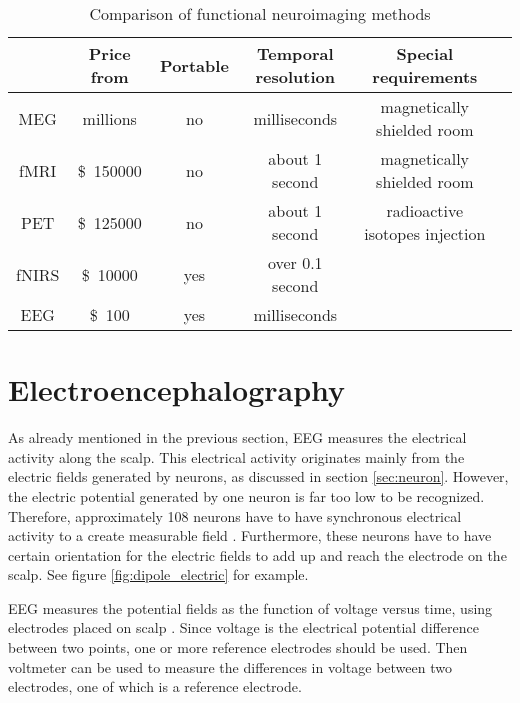 
\begin{table}[h]
	\centering
	\begin{tabular}{|c|c|c|c|c|c|}
	\hline
				& Price	from				& Portable	& Temporal resolution	& Special requirements		\\\hline
\acrshort{MEG}	& millions\pMEG				& no	& milliseconds \tresol		& magnetically shielded room\\\hline
\acrshort{fMRI}	& \SI{150000}[\$]\pfMRI		& no	& about 1 second \tresol	& magnetically shielded room\\\hline
\acrshort{PET}	& \SI{125000}[\$]\pPET		& no	& about 1 second \tresol	& radioactive isotopes injection\\\hline
\acrshort{fNIRS}& \SI{10000}[\$]{} \pNIRS	& yes	& over 0.1 second \pNIRS	&							\\\hline
\acrshort{EEG}	& \SI{100}[\$]\plEEG		& yes	& milliseconds \tresol		&							\\\hline
	\end{tabular}
	\caption{Comparison of functional neuroimaging methods}
	\label{tab:neuroimaging}
\end{table}

\section{Electroencephalography}
\label{sec:EEG}

As already mentioned in the previous section, \acrshort{EEG} measures the electrical activity along the scalp. This electrical activity originates mainly from the electric fields generated by neurons, as discussed in section \ref{sec:neuron}. However, the electric potential generated by one neuron is far too low to be recognized. Therefore, approximately 108 neurons have to have synchronous electrical activity to a create measurable field \cite{field_count}. Furthermore, these neurons have to have certain orientation for the electric fields to add up and reach the electrode on the scalp. See figure \ref{fig:dipole_electric} for example.

\acrshort{EEG} measures the potential fields as the function of voltage versus time, using electrodes placed on scalp \cite{field_count}. Since voltage is the electrical potential difference between two points, one or more reference electrodes should be used. Then voltmeter can be used to measure the differences in voltage between two electrodes, one of which is a reference electrode.

